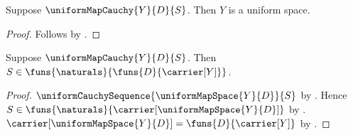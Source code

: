 \begin{proposition}\label{uniform_map_cauchy_target}
    Suppose $\uniformMapCauchy{Y}{D}{S}$.
    Then $Y$ is a uniform space.
\end{proposition}
\begin{proof}
    Follows by .
\end{proof}

\begin{proposition}\label{uniform_map_cauchy_sequence}
    Suppose $\uniformMapCauchy{Y}{D}{S}$.
    Then $S\in\funs{\naturals}{\funs{D}{\carrier[Y]}}$.
\end{proposition}
\begin{proof}
    $\uniformCauchySequence{\uniformMapSpace{Y}{D}}{S}$ by
        .
    Hence $S\in\funs{\naturals}{\carrier[\uniformMapSpace{Y}{D}]}$ by
        .
    $\carrier[\uniformMapSpace{Y}{D}]=\funs{D}{\carrier[Y]}$ by
        .
\end{proof}

